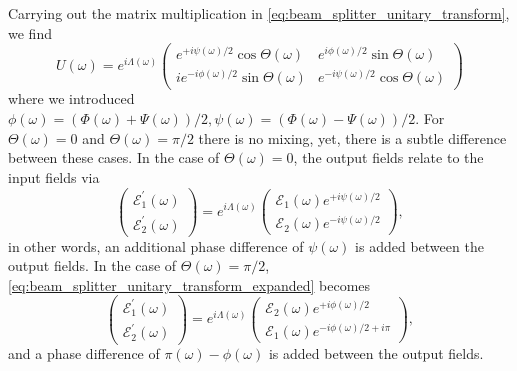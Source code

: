 Carrying out the matrix multiplication in \cref{eq:beam_splitter_unitary_transform}, we find
\begin{equation}
	U(\omega)
	=
    e^{i\Lambda(\omega)}
    \begin{pmatrix}
        e^{+i\psi(\omega)/2}\cos\Theta(\omega) & e^{i\phi(\omega)/2}\sin\Theta(\omega)
        \\
        ie^{-i\phi(\omega)/2}\sin\Theta(\omega) & e^{-i\psi(\omega)/2}\cos\Theta(\omega)
    \end{pmatrix}
    \label{eq:beam_splitter_unitary_transform_expanded}
\end{equation}
where we introduced $\phi(\omega)=(\Phi(\omega)+\Psi(\omega))/2,\psi(\omega)=(\Phi(\omega)-\Psi(\omega))/2$.
For $\Theta(\omega)=0$ and $\Theta(\omega)=\pi/2$ there is no mixing, yet, there is a subtle difference between these cases.
In the case of $\Theta(\omega)=0$, the output fields relate to the input fields via
\begin{equation}
    \begin{pmatrix}
        \mathcal{E}_1^\prime(\omega)
        \\
        \mathcal{E}_2^\prime(\omega)
    \end{pmatrix}
    =
    e^{i\Lambda(\omega)}
    \begin{pmatrix}
        \mathcal{E}_1(\omega)e^{+i\psi(\omega)/2}
        \\
        \mathcal{E}_2(\omega)e^{-i\psi(\omega)/2}
    \end{pmatrix}
    \label{eq:beam_splitter_unitary_transform_transmission},
\end{equation}
in other words, an additional phase difference of $\psi(\omega)$ is added between the output fields.
In the case of $\Theta(\omega)=\pi/2$, \cref{eq:beam_splitter_unitary_transform_expanded} becomes
\begin{equation}
    \begin{pmatrix}
        \mathcal{E}_1^\prime(\omega)
        \\
        \mathcal{E}_2^\prime(\omega)
	\end{pmatrix}
    =
    e^{i\Lambda(\omega)}
    \begin{pmatrix}
        \mathcal{E}_2(\omega)e^{+i\phi(\omega)/2}
        \\
        \mathcal{E}_1(\omega)e^{-i\phi(\omega)/2+i\pi}
    \end{pmatrix}
    \label{eq:beam_splitter_unitary_transform_reflection},
\end{equation}
and a phase difference of $\pi(\omega)-\phi(\omega)$ is added between the output fields.
